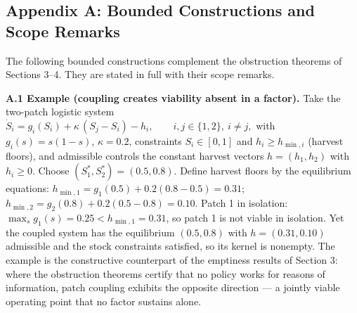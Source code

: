 \documentclass[11pt]{article}
\theoremstyle{definition}
\begin{document}
\subsection{Appendix A: Bounded Constructions and Scope
Remarks}\label{appendix-a-bounded-constructions-and-scope-remarks}

The following bounded constructions complement the obstruction theorems
of Sections 3--4. They are stated in full with their scope remarks.

\textbf{A.1 Example (coupling creates viability absent in a factor).}
Take the two-patch logistic system
\(\dot S_i = g_i(S_i) + \kappa\,(S_j - S_i) - h_i, \qquad i, j \in \{1,2\},\ i \ne j,\)
with \(g_i(s) = s(1-s)\), \(\kappa = 0.2\), constraints \(S_i \in [0,1]\) and \(h_i \ge h_{\min,i}\) (harvest floors), and admissible controls the constant harvest vectors \(h = (h_1, h_2)\) with \(h_i \ge 0\). Choose
\((S_1^*, S_2^*) = (0.5, 0.8)\). Define harvest floors by the equilibrium equations: \(h_{\min,1} = g_1(0.5) + 0.2(0.8 - 0.5) = 0.31\); \(h_{\min,2} = g_2(0.8) + 0.2(0.5 - 0.8) = 0.10\). Patch 1 in isolation:
\(\max_s g_1(s) = 0.25 < h_{\min,1} = 0.31\), so patch 1 is not viable
in isolation. Yet the coupled system has the equilibrium \((0.5, 0.8)\)
with \(h = (0.31, 0.10)\) admissible and the stock constraints
satisfied, so its kernel is nonempty. The example is the constructive
counterpart of the emptiness results of Section 3: where the obstruction
theorems certify that no policy works for reasons of information, patch
coupling exhibits the opposite direction --- a jointly viable operating
point that no factor sustains alone.
\end{document}
